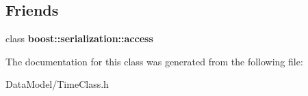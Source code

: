 \subsection*{Friends}
\begin{DoxyCompactItemize}
\item 
\hypertarget{classTimeClass_ac98d07dd8f7b70e16ccb9a01abf56b9c}{
class {\bfseries boost::serialization::access}}
\label{classTimeClass_ac98d07dd8f7b70e16ccb9a01abf56b9c}

\end{DoxyCompactItemize}


The documentation for this class was generated from the following file:\begin{DoxyCompactItemize}
\item 
DataModel/TimeClass.h\end{DoxyCompactItemize}
